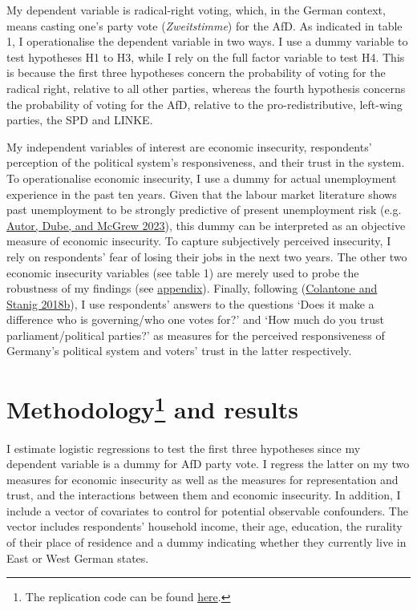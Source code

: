 \documentclass[
]{article}
\begin{document}
My dependent variable is radical-right voting, which, in the German
context, means casting one's party vote (\emph{Zweitstimme}) for the
AfD. As indicated in table 1, I operationalise the dependent variable in
two ways. I use a dummy variable to test hypotheses H1 to H3, while I
rely on the full factor variable to test H4. This is because the first
three hypotheses concern the probability of voting for the radical
right, relative to all other parties, whereas the fourth hypothesis
concerns the probability of voting for the AfD, relative to the
pro-redistributive, left-wing parties, the SPD and LINKE.

My independent variables of interest are economic insecurity,
respondents' perception of the political system's responsiveness, and
their trust in the system. To operationalise economic insecurity, I use
a dummy for actual unemployment experience in the past ten years. Given
that the labour market literature shows past unemployment to be strongly
predictive of present unemployment risk (e.g.
\protect\hyperlink{ref-autor_unexpected_2023}{Autor, Dube, and McGrew
2023}), this dummy can be interpreted as an objective measure of
economic insecurity. To capture subjectively perceived insecurity, I
rely on respondents' fear of losing their jobs in the next two years.
The other two economic insecurity variables (see table 1) are merely
used to probe the robustness of my findings (see
\protect\hyperlink{appendix}{appendix}). Finally, following
(\protect\hyperlink{ref-colantone_global_2018}{Colantone and Stanig
2018b}), I use respondents' answers to the questions `Does it make a
difference who is governing/who one votes for?' and `How much do you
trust parliament/political parties?' as measures for the perceived
responsiveness of Germany's political system and voters' trust in the
latter respectively.

\hypertarget{methodology-and-results}{%
\section[Methodology and results]{\texorpdfstring{Methodology\footnote{The
  replication code can be found
  \href{https://github.com/jacob-edenhofer/Analysing_Vote_Choice_Data_TT2023}{here}.}
and results}{Methodology and results}}\label{methodology-and-results}}

I estimate logistic regressions to test the first three hypotheses since
my dependent variable is a dummy for AfD party vote. I regress the
latter on my two measures for economic insecurity as well as the
measures for representation and trust, and the interactions between them
and economic insecurity. In addition, I include a vector of covariates
to control for potential observable confounders. The vector includes
respondents' household income, their age, education, the rurality of
their place of residence and a dummy indicating whether they currently
live in East or West German states.
\end{document}
